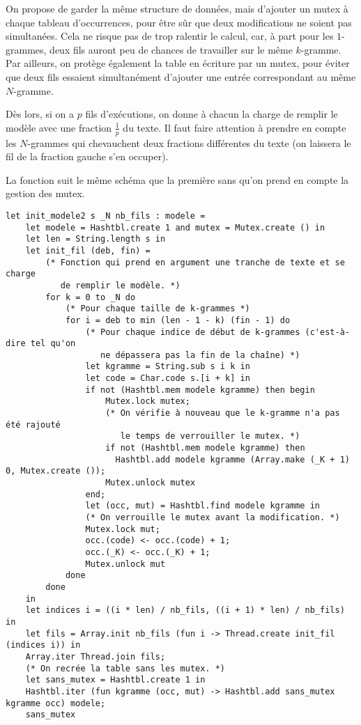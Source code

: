 \documentclass[10pt]{article}
\begin{document}
\begin{Exercise}
On propose de garder la même structure de données, mais d'ajouter un mutex à chaque tableau d'occurrences, pour être sûr que deux modifications ne soient pas simultanées. Cela ne risque pas de trop ralentir le calcul, car, à part pour les $1$-grammes, deux fils auront peu de chances de travailler sur le même $k$-gramme. Par ailleurs, on protège également la table en écriture par un mutex, pour éviter que deux fils essaient simultanément d'ajouter une entrée correspondant au même $N$-gramme.

Dès lors, si on a $p$ fils d'exécutions, on donne à chacun la charge de remplir le modèle avec une fraction $\frac{1}{p}$ du texte. Il faut faire attention à prendre en compte les $N$-grammes qui chevauchent deux fractions différentes du texte (on laissera le fil de la fraction gauche s'en occuper).
\end{Exercise}

\begin{Exercise}
La fonction suit le même schéma que la première sans qu'on prend en compte la gestion des mutex.
\begin{cbox}
   \begin{verbatim}
let init_modele2 s _N nb_fils : modele =
    let modele = Hashtbl.create 1 and mutex = Mutex.create () in
    let len = String.length s in
    let init_fil (deb, fin) =
        (* Fonction qui prend en argument une tranche de texte et se charge
           de remplir le modèle. *)        
        for k = 0 to _N do
            (* Pour chaque taille de k-grammes *)
            for i = deb to min (len - 1 - k) (fin - 1) do
                (* Pour chaque indice de début de k-grammes (c'est-à-dire tel qu'on
                   ne dépassera pas la fin de la chaîne) *)
                let kgramme = String.sub s i k in
                let code = Char.code s.[i + k] in
                if not (Hashtbl.mem modele kgramme) then begin
                    Mutex.lock mutex;
                    (* On vérifie à nouveau que le k-gramme n'a pas été rajouté
                       le temps de verrouiller le mutex. *)
                    if not (Hashtbl.mem modele kgramme) then
                      Hashtbl.add modele kgramme (Array.make (_K + 1) 0, Mutex.create ());
                    Mutex.unlock mutex
                end;
                let (occ, mut) = Hashtbl.find modele kgramme in
                (* On verrouille le mutex avant la modification. *)
                Mutex.lock mut;
                occ.(code) <- occ.(code) + 1;
                occ.(_K) <- occ.(_K) + 1;
                Mutex.unlock mut
            done
        done
    in
    let indices i = ((i * len) / nb_fils, ((i + 1) * len) / nb_fils) in
    let fils = Array.init nb_fils (fun i -> Thread.create init_fil (indices i)) in
    Array.iter Thread.join fils;
    (* On recrée la table sans les mutex. *)
    let sans_mutex = Hashtbl.create 1 in
    Hashtbl.iter (fun kgramme (occ, mut) -> Hashtbl.add sans_mutex kgramme occ) modele;
    sans_mutex
   \end{verbatim}
\end{cbox}
\end{Exercise}
\end{document}
